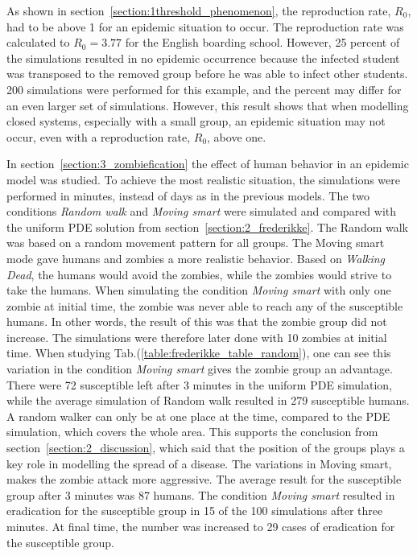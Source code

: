 \documentclass[%
twoside,                 %
final,                   %
chapterprefix=true,      %
open=right               %
10pt]{book}
\begin{document}
\vspace{3mm}




\vspace{3mm}


As shown in section~\ref{section:1threshold_phenomenon}, the reproduction rate, $R_0$, had to be above 1 for an epidemic situation to occur. The reproduction rate was calculated to $R_0=3.77$ for the English boarding school. However, 25 percent of the simulations resulted in no epidemic occurrence because the infected student was transposed to the removed group before he was able to infect other students. 200 simulations were performed for this example, and the percent may differ for an even larger set of simulations. However, this result shows that when modelling closed systems, especially with a small group, an epidemic situation may not occur, even with a reproduction rate, $R_0$, above one. 


\vspace{3mm}




\vspace{3mm}


In section~\ref{section:3_zombiefication} the effect of human behavior in an epidemic model was studied. To achieve the most realistic situation, the simulations were performed in minutes, instead of days as in the previous models. The two conditions \emph{Random walk} and \emph{Moving smart} were simulated and compared with the uniform PDE solution from section~\ref{section:2_frederikke}. The Random walk was based on a random movement pattern for all groups. The Moving smart mode gave humans and zombies a more realistic behavior. Based on \emph{Walking Dead}, the humans would avoid the zombies, while the zombies would strive to take the humans. When simulating the condition \emph{Moving smart} with only one zombie at initial time, the zombie was never able to reach any of the susceptible humans. In other words, the result of this was that the zombie group did not increase. The simulations were therefore later done with 10 zombies at initial time. When studying Tab.(\ref{table:frederikke_table_random}), one can see this variation in the condition \emph{Moving smart} gives the zombie group an advantage. There were 72 susceptible left after 3 minutes in the uniform PDE simulation, while the average simulation of Random walk resulted in 279 susceptible humans. A random walker can only be at one place at the time, compared to the PDE simulation, which covers the whole area. This supports the conclusion from section~\ref{section:2_discussion}, which said that the position of the groups plays a key role in modelling the spread of a disease. The variations in Moving smart, makes the zombie attack more aggressive. The average result for the susceptible group after 3 minutes was 87 humans. The condition \emph{Moving smart} resulted in eradication for the susceptible group in 15 of the 100 simulations after three minutes. At final time, the number was increased to 29 cases of eradication for the susceptible group.       
\end{document}
